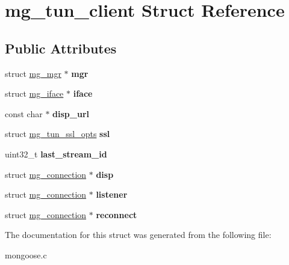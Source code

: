 \hypertarget{structmg__tun__client}{}\section{mg\+\_\+tun\+\_\+client Struct Reference}
\label{structmg__tun__client}
\subsection*{Public Attributes}
\begin{DoxyCompactItemize}
\item 
\mbox{\label{structmg__tun__client_a6d8252150b0c44c00f00d2e5ef20d88b}} 
struct \hyperlink{structmg__mgr}{mg\+\_\+mgr} $\ast$ {\bfseries mgr}
\item 
\mbox{\label{structmg__tun__client_ad83d50edc28747fbaae7dc914a908e7f}} 
struct \hyperlink{structmg__iface}{mg\+\_\+iface} $\ast$ {\bfseries iface}
\item 
\mbox{\label{structmg__tun__client_ae2702c91d02403ab47e96cfa00748171}} 
const char $\ast$ {\bfseries disp\+\_\+url}
\item 
\mbox{\label{structmg__tun__client_a8e2503ec635c4e69b547b6aed64bed37}} 
struct \hyperlink{structmg__tun__ssl__opts}{mg\+\_\+tun\+\_\+ssl\+\_\+opts} {\bfseries ssl}
\item 
\mbox{\label{structmg__tun__client_a8f57544d695fdb0377020fe4288e2403}} 
uint32\+\_\+t {\bfseries last\+\_\+stream\+\_\+id}
\item 
\mbox{\label{structmg__tun__client_ab5de89e0196eb61c58d0d015c2355c21}} 
struct \hyperlink{structmg__connection}{mg\+\_\+connection} $\ast$ {\bfseries disp}
\item 
\mbox{\label{structmg__tun__client_a023920ae1a96f98f546ea70df7d710df}} 
struct \hyperlink{structmg__connection}{mg\+\_\+connection} $\ast$ {\bfseries listener}
\item 
\mbox{\label{structmg__tun__client_a49657c0a96dc128f11dc2d7658bfd06b}} 
struct \hyperlink{structmg__connection}{mg\+\_\+connection} $\ast$ {\bfseries reconnect}
\end{DoxyCompactItemize}


The documentation for this struct was generated from the following file\+:\begin{DoxyCompactItemize}
\item 
mongoose.\+c\end{DoxyCompactItemize}
